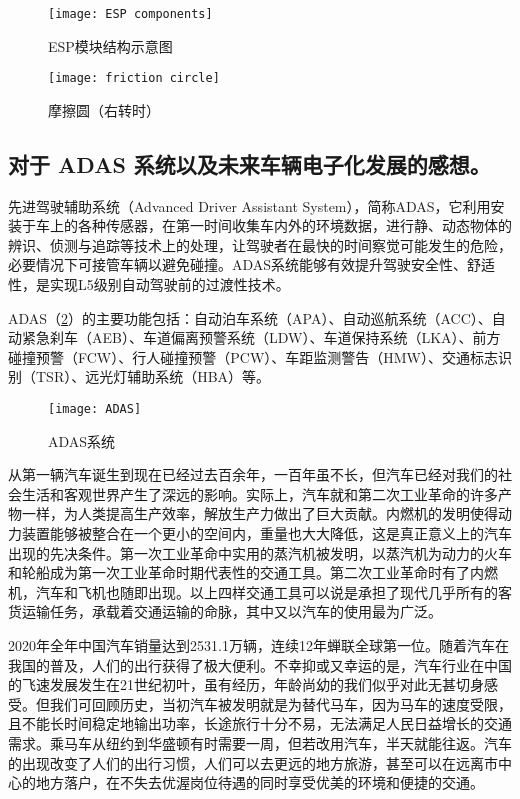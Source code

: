 \documentclass[UTF8]{ctexart}
\numberwithin{figure}{section}
\numberwithin{table}{section}
\begin{document}
\begin{figure}[htbp]
	\centering
	\begin{minipage}[b]{0.59\textwidth}
		\centering
		\texttt{[image: ESP components]}
		\caption{ESP模块结构示意图}
		\label{ESP components}
	\end{minipage}
	\begin{minipage}[b]{0.4\textwidth}
		\centering
		\texttt{[image: friction circle]}
		\caption{摩擦圆（右转时）}
		\label{friction circle}
	\end{minipage}
\end{figure}

\subsection{对于 ADAS 系统以及未来车辆电子化发展的感想。}

先进驾驶辅助系统（Advanced Driver Assistant System），简称ADAS，它利用安装于车上的各种传感器，在第一时间收集车内外的环境数据，进行静、动态物体的辨识、侦测与追踪等技术上的处理，让驾驶者在最快的时间察觉可能发生的危险，必要情况下可接管车辆以避免碰撞。ADAS系统能够有效提升驾驶安全性、舒适性，是实现L5级别自动驾驶前的过渡性技术。

ADAS（\cref{ADAS}）的主要功能包括：自动泊车系统（APA）、自动巡航系统（ACC）、自动紧急刹车（AEB）、车道偏离预警系统（LDW）、车道保持系统（LKA）、前方碰撞预警（FCW）、行人碰撞预警（PCW）、车距监测警告（HMW）、交通标志识别（TSR）、远光灯辅助系统（HBA）等。

\begin{figure}[htbp]
	\centering
	\begin{minipage}[b]{\textwidth}
		\centering
		\texttt{[image: ADAS]}
		\caption{ADAS系统}
		\label{ADAS}
	\end{minipage}
\end{figure}

从第一辆汽车诞生到现在已经过去百余年，一百年虽不长，但汽车已经对我们的社会生活和客观世界产生了深远的影响。实际上，汽车就和第二次工业革命的许多产物一样，为人类提高生产效率，解放生产力做出了巨大贡献。内燃机的发明使得动力装置能够被整合在一个更小的空间内，重量也大大降低，这是真正意义上的汽车出现的先决条件。第一次工业革命中实用的蒸汽机被发明，以蒸汽机为动力的火车和轮船成为第一次工业革命时期代表性的交通工具。第二次工业革命时有了内燃机，汽车和飞机也随即出现。以上四样交通工具可以说是承担了现代几乎所有的客货运输任务，承载着交通运输的命脉，其中又以汽车的使用最为广泛。

2020年全年中国汽车销量达到2531.1万辆，连续12年蝉联全球第一位。随着汽车在我国的普及，人们的出行获得了极大便利。不幸抑或又幸运的是，汽车行业在中国的飞速发展发生在21世纪初叶，虽有经历，年龄尚幼的我们似乎对此无甚切身感受。但我们可回顾历史，当初汽车被发明就是为替代马车，因为马车的速度受限，且不能长时间稳定地输出功率，长途旅行十分不易，无法满足人民日益增长的交通需求。乘马车从纽约到华盛顿有时需要一周，但若改用汽车，半天就能往返。汽车的出现改变了人们的出行习惯，人们可以去更远的地方旅游，甚至可以在远离市中心的地方落户，在不失去优渥岗位待遇的同时享受优美的环境和便捷的交通。
\end{document}
